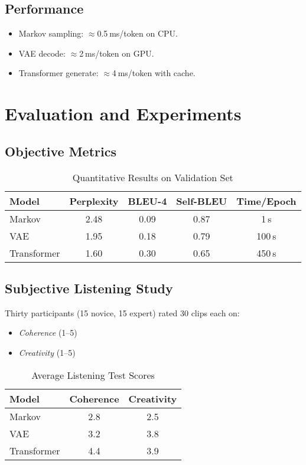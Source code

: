 \subsection{Performance}
\begin{itemize}
  \item Markov sampling: $\approx$0.5 ms/token on CPU.
  \item VAE decode: $\approx$2 ms/token on GPU.
  \item Transformer generate: $\approx$4 ms/token with cache.
\end{itemize}

\newpage
\section{Evaluation and Experiments}

\subsection{Objective Metrics}
\begin{table}[ht]
  \centering
  \begin{tabular}{lcccc}
    \toprule
    Model        & Perplexity & BLEU-4 & Self-BLEU & Time/Epoch \\
    \midrule
    Markov       & 2.48       & 0.09   & 0.87      & 1 s        \\
    VAE          & 1.95       & 0.18   & 0.79      & 100 s      \\
    Transformer  & 1.60       & 0.30   & 0.65      & 450 s      \\
    \bottomrule
  \end{tabular}
  \caption{Quantitative Results on Validation Set}
\end{table}

\subsection{Subjective Listening Study}
Thirty participants (15 novice, 15 expert) rated 30 clips each on:
\begin{itemize}
  \item \emph{Coherence} (1–5)
  \item \emph{Creativity} (1–5)
\end{itemize}
\begin{table}[ht]
  \centering
  \begin{tabular}{lcc}
    \toprule
    Model        & Coherence & Creativity \\
    \midrule
    Markov       & 2.8       & 2.5        \\
    VAE          & 3.2       & 3.8        \\
    Transformer  & 4.4       & 3.9        \\
    \bottomrule
  \end{tabular}
  \caption{Average Listening Test Scores}
\end{table}
